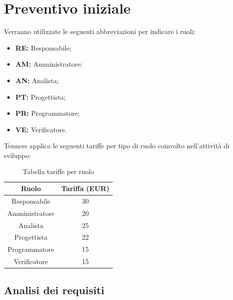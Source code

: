 \section{Preventivo iniziale}
Verranno utilizzate le seguenti abbreviazioni per indicare i ruoli:
\begin{itemize}
	\item \textbf{RE:} Responsabile;
	\item \textbf{AM:} Amministratore;
	\item \textbf{AN:} Analista;
	\item \textbf{PT:} Progettista;
	\item \textbf{PR:} Programmatore;
	\item \textbf{VE:} Verificatore.
\end{itemize}
Tenners applica le seguenti tariffe per tipo di ruolo coinvolto nell'attività di sviluppo:\\
\begin{table}[h]
\caption{Tabella tariffe per ruolo}            
\begin{center}
\begin{tabular}{ |c|c|  }
 \hline
 Ruolo 		& Tariffa (EUR)\\
 \hline\hline
	Responsabile	& 30\\
	Amministratore	& 20\\
	Analista		& 25\\
	Progettista		& 22\\
	Programmatore	& 15\\
	Verificatore	& 15\\
 \hline
\end{tabular}
\end{center}
\end{table}
\newpage
\subsection{Analisi dei requisiti}
